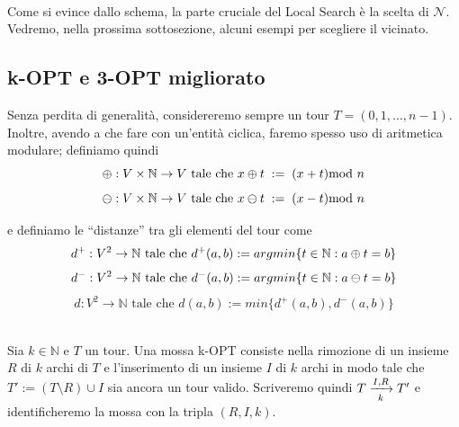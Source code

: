     
    
    
    
\ \\

Come si evince dallo schema, la parte cruciale del Local Search è la scelta di $\mathcal{N}$. Vedremo, nella prossima
sottosezione, alcuni esempi per scegliere il vicinato.

\subsection{k-OPT e 3-OPT migliorato}

Senza perdita di generalità, considereremo sempre un tour $T = (0, 1, \dots, n-1)$. Inoltre, avendo a che fare 
con un'entità ciclica, faremo spesso uso di aritmetica modulare; definiamo quindi 
$$\pls: V\times\mathbb{N} \rightarrow V \text{ tale che } x\pls{}t\; := \;(x+t)\!\!\!\!\mod{}n $$
$$\mns: V\times\mathbb{N} \rightarrow V \text{ tale che } x\mns{}t\; := \;(x-t)\!\!\!\!\mod{}n $$

e definiamo le ``distanze'' tra gli elementi del tour come 
$$d^+: V^2 \rightarrow \mathbb{N} \text{ tale che } d^+(a, b) := argmin\{t \in \mathbb{N} : a\pls{}t=b\}$$
$$d^-: V^2 \rightarrow \mathbb{N} \text{ tale che } d^-(a, b) := argmin\{t \in \mathbb{N} : a\mns{}t=b\}$$
$$d: V^2 \rightarrow \mathbb{N} \text{ tale che } d(a, b) := min\{d^+(a, b), d^-(a, b)\}$$
\ \\

\begin{definition}
Sia $k \in \mathbb{N}$ e $T$ un tour. Una mossa k-OPT consiste nella rimozione di un insieme $R$ di $k$ archi
di $T$ e l'inserimento di un insieme $I$ di $k$ archi in modo tale che $T' := (T\setminus{}R)\cup{}I$ sia ancora
un tour valido. Scriveremo quindi $T \opt{I}{R}{k} T'$ e identificheremo la mossa con la tripla $(R,I,k)$.
\end{definition}

